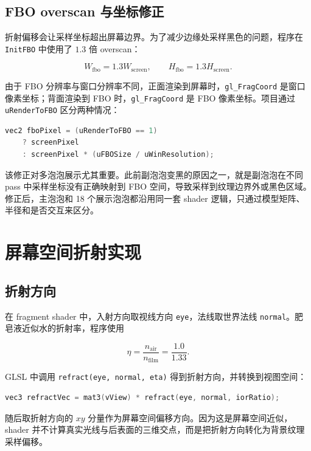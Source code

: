 \documentclass[UTF8,a4paper,11pt]{ctexart}
\newcommand{\codepath}[1]{\texttt{#1}}
\begin{document}
\subsection{FBO overscan 与坐标修正}

折射偏移会让采样坐标超出屏幕边界。为了减少边缘处采样黑色的问题，程序在 \codepath{InitFBO} 中使用了 $1.3$ 倍 overscan：

\[
W_{\mathrm{fbo}} = 1.3 W_{\mathrm{screen}}, \qquad
H_{\mathrm{fbo}} = 1.3 H_{\mathrm{screen}}.
\]

由于 FBO 分辨率与窗口分辨率不同，正面渲染到屏幕时，\codepath{gl\_FragCoord} 是窗口像素坐标；背面渲染到 FBO 时，\codepath{gl\_FragCoord} 是 FBO 像素坐标。项目通过 \codepath{uRenderToFBO} 区分两种情况：

\begin{lstlisting}[language=C++]
vec2 fboPixel = (uRenderToFBO == 1)
    ? screenPixel
    : screenPixel * (uFBOSize / uWinResolution);
\end{lstlisting}

该修正对多泡泡展示尤其重要。此前副泡泡变黑的原因之一，就是副泡泡在不同 pass 中采样坐标没有正确映射到 FBO 空间，导致采样到纹理边界外或黑色区域。修正后，主泡泡和 18 个展示泡泡都沿用同一套 shader 逻辑，只通过模型矩阵、半径和是否交互来区分。

\section{屏幕空间折射实现}

\subsection{折射方向}

在 fragment shader 中，入射方向取视线方向 \codepath{eye}，法线取世界法线 \codepath{normal}。肥皂液近似水的折射率，程序使用

\[
\eta = \frac{n_{\mathrm{air}}}{n_{\mathrm{film}}} = \frac{1.0}{1.33}.
\]

GLSL 中调用 \codepath{refract(eye, normal, eta)} 得到折射方向，并转换到视图空间：

\begin{lstlisting}[language=C++]
vec3 refractVec = mat3(vView) * refract(eye, normal, iorRatio);
\end{lstlisting}

随后取折射方向的 $xy$ 分量作为屏幕空间偏移方向。因为这是屏幕空间近似，shader 并不计算真实光线与后表面的三维交点，而是把折射方向转化为背景纹理采样偏移。
\end{document}
